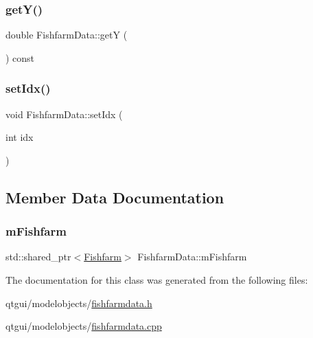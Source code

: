 \mbox{\label{class_fishfarm_data_a98adbc6e4567e9248c6b594a3fff7242}} 
\subsubsection{\texorpdfstring{getY()}{getY()}}
{\footnotesize\ttfamily double Fishfarm\+Data\+::getY (\begin{DoxyParamCaption}{ }\end{DoxyParamCaption}) const}

\mbox{\label{class_fishfarm_data_a2023a1d96ff75a5ae0eb2c076accd71b}} 
\subsubsection{\texorpdfstring{setIdx()}{setIdx()}}
{\footnotesize\ttfamily void Fishfarm\+Data\+::set\+Idx (\begin{DoxyParamCaption}\item[{int}]{idx }\end{DoxyParamCaption})}



\subsection{Member Data Documentation}
\mbox{\label{class_fishfarm_data_a062fd5764caa6e2c9fb2dc19b0fe0c1d}} 
\subsubsection{\texorpdfstring{mFishfarm}{mFishfarm}}
{\footnotesize\ttfamily std\+::shared\+\_\+ptr$<$\mbox{\hyperlink{class_fishfarm}{Fishfarm}}$>$ Fishfarm\+Data\+::m\+Fishfarm}



The documentation for this class was generated from the following files\+:\begin{DoxyCompactItemize}
\item 
qtgui/modelobjects/\mbox{\hyperlink{fishfarmdata_8h}{fishfarmdata.\+h}}\item 
qtgui/modelobjects/\mbox{\hyperlink{fishfarmdata_8cpp}{fishfarmdata.\+cpp}}\end{DoxyCompactItemize}
